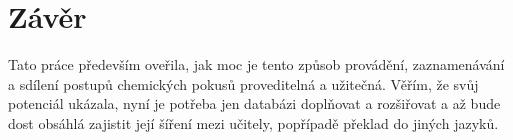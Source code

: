 \newpage
\chapter*{Závěr}

Tato práce především oveřila, jak moc je tento způsob provádění, zaznamenávání a sdílení postupů chemických pokusů proveditelná a užitečná. Věřím, že svůj potenciál ukázala, nyní je potřeba jen databázi doplňovat a rozšiřovat a až bude dost obsáhlá zajistit její šíření mezi učitely, popřípadě překlad do jiných jazyků.
